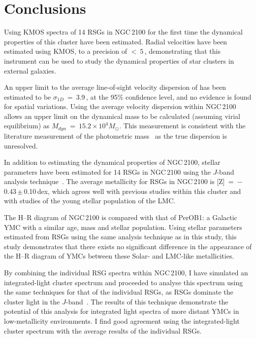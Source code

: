 
\section{Conclusions} %
\label{sec:ngc2100conc}

Using KMOS spectra of 14 RSGs in NGC\,2100 for the first time the dynamical properties of this cluster have been estimated.
Radial velocities have been estimated using KMOS, to a precision of $<~5$\,\kms, demonstrating that this instrument can be used to study the dynamical properties of star clusters in external galaxies.

An upper limit to the average line-of-sight velocity dispersion of has been estimated to be $\sigma_{1D}$~=~3.9\,\kms, at the 95\% confidence level, and no evidence is found for spatial variations.
Using the average velocity dispersion within NGC\,2100 allows an upper limit on the dynamical mass to be calculated
(assuming virial equilibrium) as $M_{dyn}$~=~$15.2\times 10^{4}M_{\odot}$.
This measurement is consistent with the literature measurement of the photometric mass~\citep{2005ApJS..161..304M} as the true dispersion is unresolved.

In addition to estimating the dynamical properties of NGC\,2100,
stellar parameters have been estimated for 14 RSGs in NGC\,2100 using the $J$-band analysis technique~\citep{2010MNRAS.407.1203D}.
The average metallicity for RSGs in NGC\,2100 is [Z]~=~$-$0.43\,$\pm$\,0.10\,dex, which agrees well with previous studies within this cluster and with studies of the young stellar population of the LMC.

The H--R diagram of NGC\,2100 is compared with that of PerOB1: a Galactic YMC with a similar age, mass and stellar population.
Using stellar parameters estimated from RSGs using the same analysis technique as in this study,
this study demonstrates that there exists no significant difference in the appearance of the H--R diagram of YMCs between these Solar- and LMC-like metallicities.

By combining the individual RSG spectra within NGC\,2100, I have simulated an integrated-light cluster spectrum and proceeded to analyse this spectrum using the same techniques for that of the individual RSGs, as RSGs dominate the cluster light in the $J$-band~\citep{2013MNRAS.430L..35G}.
The results of this technique demonstrate the potential of this analysis for integrated light spectra of more distant YMCs in low-metallicity environments.
I find good agreement using the integrated-light cluster spectrum with the average results of the individual RSGs.

